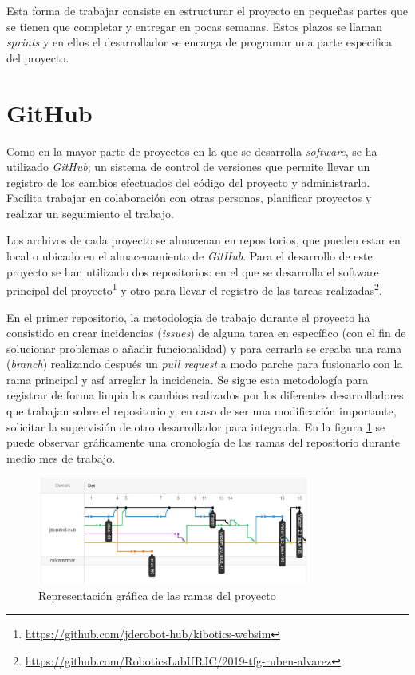 Esta forma de trabajar consiste en estructurar el proyecto en pequeñas partes que se tienen que completar y entregar en pocas semanas. Estos plazos se llaman \textit{sprints} y en ellos el desarrollador se encarga de programar una parte especifica del proyecto. 
\section{GitHub}
\label{sec:github}
Como en la mayor parte de proyectos en la que se desarrolla \textit{software}, se ha utilizado \textit{GitHub}; un sistema de control de versiones que permite llevar un registro de los cambios efectuados del código del proyecto y administrarlo. Facilita trabajar en colaboración con otras personas, planificar proyectos y realizar un seguimiento el trabajo. \newline

Los archivos de cada proyecto se almacenan en repositorios, que pueden estar en local o ubicado en el almacenamiento de \textit{GitHub}. Para el desarrollo de este proyecto se han utilizado dos repositorios:  en el que se desarrolla el software principal del proyecto\footnote{\url{https://github.com/jderobot-hub/kibotics-websim}} y otro para llevar el registro de las tareas realizadas\footnote{\url{https://github.com/RoboticsLabURJC/2019-tfg-ruben-alvarez}}.
\newline

En el primer repositorio, la metodología de trabajo durante el proyecto ha consistido en crear incidencias (\textit{issues}) de alguna tarea en específico (con el fin de solucionar problemas o añadir funcionalidad) y para cerrarla se creaba una rama (\textit{branch}) realizando después un \textit{pull request} a modo parche para fusionarlo con la rama principal y así arreglar la incidencia. Se sigue esta metodología para registrar de forma limpia los cambios realizados por los diferentes desarrolladores que trabajan sobre el repositorio y, en caso de ser una modificación importante, solicitar la supervisión de otro desarrollador para integrarla. En la figura \ref{fig:github} se puede observar gráficamente una cronología de las ramas del repositorio durante medio mes de trabajo.

 \begin{figure}[H]
    \centering
    \includegraphics[width=0.8\textwidth]{img/github.jpg}
    \caption{Representación gráfica de las ramas del proyecto} \label{fig:github}
\end{figure}


